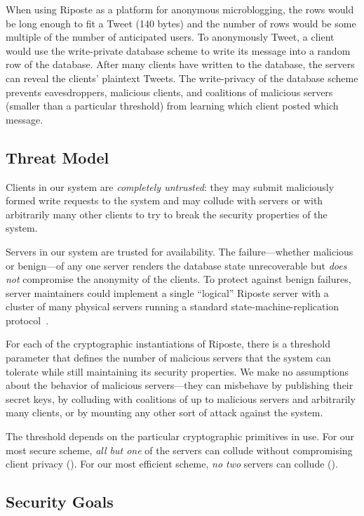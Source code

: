 \documentclass[10pt,twocolumn]{article}
\newcommand{\name}{Riposte\xspace}
\begin{document}
When using \name as a platform for anonymous microblogging, the rows
would be long enough to fit a Tweet (140 bytes) and the number of rows would be
some multiple of the number of anticipated users.
To anonymously Tweet, a client would use the write-private database scheme to 
write its message into a random row of the database.
After many clients have written to the database, the servers can
reveal the clients' plaintext Tweets.
The write-privacy of the database scheme prevents eavesdroppers, malicious clients, 
and coalitions of malicious servers (smaller than a particular threshold) from
learning which client posted which message.

\subsection{Threat Model}
\label{sec:goal:threat}

Clients in our system are {\em completely untrusted}: they
may submit maliciously formed write requests to the system
and may collude with servers or with arbitrarily many other
clients to try to break the security properties of the system.

Servers in our system are trusted for availability. 
The failure---whether malicious or benign---of any one server 
renders the database state unrecoverable but {\em does not}
compromise the anonymity of the clients.
To protect against benign failures, server maintainers could
implement a single ``logical'' \name server with a cluster
of many physical servers running a
standard state-machine-replication 
protocol~\cite{liskov2012viewstamped,ongaro2014search}.

For each of the cryptographic instantiations of \name, there is a
threshold parameter  that defines the number of malicious servers
that the system can tolerate while still maintaining its security
properties.  We make no assumptions about the behavior of malicious
servers---they can misbehave 
by publishing their secret keys, 
by colluding with coalitions of up
to  malicious servers and arbitrarily many clients, 
or by mounting any other sort of attack against the system.

The threshold  depends on the particular 
cryptographic primitives in use.
For our most secure scheme, {\em all but one} of the servers can
collude without compromising client privacy ().
For our most efficient scheme, {\em no two} servers can collude ().

\subsection{Security Goals}
\end{document}
